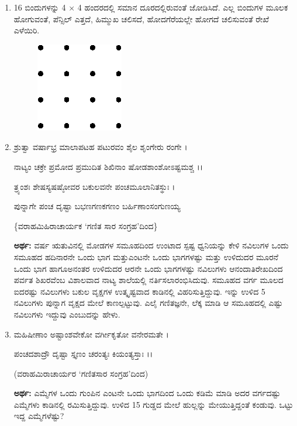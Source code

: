 \begin{enumerate}
\item 16 ಬಿಂದುಗಳನ್ನು 4 $\times$ 4 ಹಂದರದಲ್ಲಿ ಸಮಾನ ದೂರದಲ್ಲಿರುವಂತೆ ಜೋಡಿಸಿದೆ. ಎಲ್ಲ ಬಿಂದುಗಳ ಮೂಲಕ ಹೋಗುವಂತೆ, ಪೆನ್ಸಿಲ್ ಎತ್ತದೆ, ಹಿಮ್ಮುಖ ಚಲಿಸದೆ, ಹೋದಗೆರೆಯಲ್ಲೇ ಹೋಗದೆ ಚಲಿಸುವಂತೆ ರೇಖೆ ಎಳೆಯಿರಿ. 
\begin{figure}[H]
\centering
\includegraphics[scale=1.2]{images/chap11/q17.eps}
\end{figure}


\item ಶ್ರುತ್ವಾ ವರ್ಷಾಭ್ರ ಮಾಲಾಪಟಹ ಪಟುರವಂ ಶೈಲ ಶೃಂಗೇರು ರಂಗೇ ।

ನಾಟ್ಯಂ ಚಕ್ರೇ ಪ್ರಮೋದ ಪ್ರಮುದಿತ ಶಿಖಿನಾಂ ಷೋಡಶಾಂಶೋಽಷ್ಟಮಶ್ಚ ।।

ತ್ರ್ಯಂಶಃ ಶೇಷಸ್ಯಷಷ್ಠೋವರ ಬಕುಲವನೇ ಪಂಚಮೂಲಾನಿತಸ್ಥುಃ ।

ಪುನ್ನಾಗೇ ಪಂಚ ದೃಷ್ಟಾ ಬಭಣಗಣಕಗಣಂ ಬರ್ಹಿಣಾಂಸಂಗುಣಯ್ಯ 

\smallskip

\hfill \{ವರಾಹಮಿಹಿರಾಚಾರ್ಯಕ `ಗಣಿತ ಸಾರ ಸಂಗ್ರಹ'ದಿಂದ\}

\smallskip

{\bf ಅರ್ಥ:} ವರ್ಷ ಋತುವಿನಲ್ಲಿ ಮೋಡಗಳ ಸಮೂಹದಿಂದ ಉಂಟಾದ ಸ್ಪಷ್ಟ ಧ್ವನಿಯನ್ನು ಕೇಳಿ ನವಿಲುಗಳ ಒಂದು ಸಮೂಹದ ಹದಿನಾರನೇ ಒಂದು ಭಾಗ ಮತ್ತು\break ಎಂಟನೇ ಒಂದು ಭಾಗಗಳಷ್ಟು ಮತ್ತು ಉಳಿದುದರ ಮೂರನೆ ಒಂದು ಭಾಗ ಹಾಗೂ\break ಅನಂತರ ಉಳಿದುದರ ಆರನೇ ಒಂದು ಭಾಗಗಳಷ್ಟು ನವಿಲುಗಳು ಆನಂದಾತಿ\break ರೇಖದಿಂದ ಪರ್ವತ ಶಿಖರವೆಂಬ ವಿಶಾಲವಾದ ನಾಟ್ಯ ಶಾಲೆಯಲ್ಲಿ ನರ್ತಿಸಲಾ\-ರಂಭಿಸಿದುವು. ಸಮೂಹದ ವರ್ಗ ಮೂಲದ ಐದರಷ್ಟು ನವಿಲುಗಳು ಬಕುಲ ವೃಕ್ಷಗಳ ಉತ್ಕೃಷ್ಟವಾದ ಕಾಡಿನಲ್ಲಿ ವಿಹರಿಸುತ್ತಿದ್ದುವು. ಇನ್ನು ಉಳಿದ 5 ನವಿಲುಗಳು ಪುನ್ನಾಗ ವೃಕ್ಷದ ಮೇಲೆ ಕಾಣಲ್ಪಟ್ಟುವು. ಎಲೈ ಗಣಿತಜ್ಞನೇ, ಲೆಕ್ಕ ಮಾಡಿ ಆ ಸಮೂಹದಲ್ಲಿ ಎಷ್ಟು ನವಿಲುಗಳು ಇದ್ದುವು ಎಂಬುದನ್ನು ಹೇಳು.  

\item ಮಹಿಷೀಣಾಂ ಅಷ್ಟಾಂಶವೇಕೋ ವರ್ಗೀಕೃತೋ ವನೇರಮತೇ ।

ಪಂಚದಶಾದ್ರೌ ದೃಷ್ಟಾ ಸ್ತೃಣಂ ಚರಂತ್ಯಃ ಕಿಯಂತ್ಯಸ್ತಾಃ ।।

\smallskip

\hfill (ವರಾಹಮಿರಾಚಾರ್ಯರ `ಗಣಿತಸಾರ ಸಂಗ್ರಹ'ದಿಂದ)

\smallskip

{\bf ಅರ್ಥ:} ಎಮ್ಮೆಗಳ ಒಂದು ಗುಂಪಿನ ಎಂಟನೇ ಒಂದು ಭಾಗದಿಂದ ಒಂದು ಕಡಿಮೆ ಮಾಡಿ ಅದರ ವರ್ಗದಷ್ಟು ಎಮ್ಮೆಗಳು ಕಾಡಿನಲ್ಲಿ ರಮಿಸುತ್ತಿದ್ದುವು. ಉಳಿದ 15 ಗುಡ್ಡದ ಮೇಲೆ ಹುಲ್ಲನ್ನು ಮೇಯುತ್ತಿದ್ದಂತೆ ಕಂಡುವು. ಒಟ್ಟು ಇದ್ದ ಎಮ್ಮೆಗಳೆಷ್ಟು? 


\end{enumerate}
